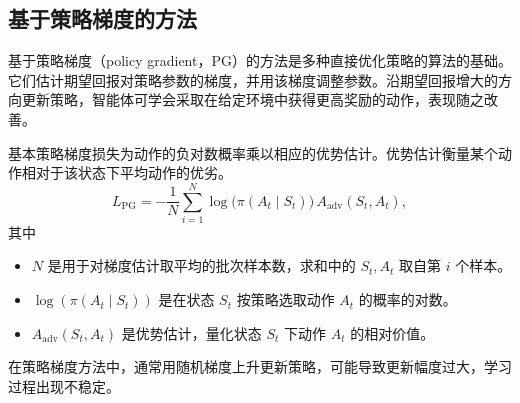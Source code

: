 \subsection{基于策略梯度的方法}
\label{sec:appb-policy-gradients}
基于策略梯度（policy gradient，PG）的方法是多种直接优化策略的算法的基础。它们估计期望回报对策略参数的梯度，并用该梯度调整参数。沿期望回报增大的方向更新策略，智能体可学会采取在给定环境中获得更高奖励的动作，表现随之改善。

基本策略梯度损失为动作的负对数概率乘以相应的优势估计。优势估计衡量某个动作相对于该状态下平均动作的优劣。
\begin{equation}
L_{\mathrm{PG}}=-\frac1N\sum_{i=1}^{N}
\log\bigl(\pi(A_t\mid S_t)\bigr)\,A_{\mathrm{adv}}(S_t,A_t),
\label{eq:appb-pg-loss}
\end{equation}
其中
\begin{itemize}
\item $N$ 是用于对梯度估计取平均的批次样本数，求和中的 $S_t,A_t$ 取自第 $i$ 个样本。
\item $\log(\pi(A_t\mid S_t))$ 是在状态 $S_t$ 按策略选取动作 $A_t$ 的概率的对数。
\item $A_{\mathrm{adv}}(S_t,A_t)$ 是优势估计，量化状态 $S_t$ 下动作 $A_t$ 的相对价值。
\end{itemize}
在策略梯度方法中，通常用随机梯度上升更新策略，可能导致更新幅度过大，学习过程出现不稳定。

